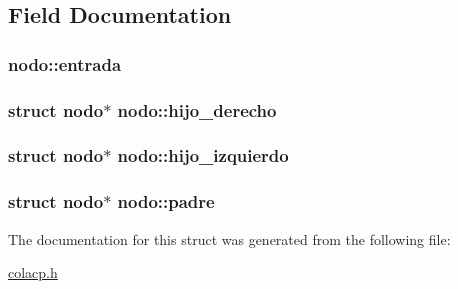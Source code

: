 \subsection{Field Documentation}
\hypertarget{structnodo_a6f1aad5bb142f067c93fe4b62ac8eb5b}{
\subsubsection[{entrada}]{ nodo\+::entrada}}\label{structnodo_a6f1aad5bb142f067c93fe4b62ac8eb5b}
\hypertarget{structnodo_af130c51b632b654403d8e49366918f9f}{
\subsubsection[{hijo\+\_\+derecho}]{\setlength{\rightskip}{0pt plus 5cm}struct {\bf nodo}$\ast$ nodo\+::hijo\+\_\+derecho}}\label{structnodo_af130c51b632b654403d8e49366918f9f}
\hypertarget{structnodo_afa64cf5f8a5d1df0ff495e7e915f0b67}{
\subsubsection[{hijo\+\_\+izquierdo}]{\setlength{\rightskip}{0pt plus 5cm}struct {\bf nodo}$\ast$ nodo\+::hijo\+\_\+izquierdo}}\label{structnodo_afa64cf5f8a5d1df0ff495e7e915f0b67}
\hypertarget{structnodo_ade731255c7e9f0a7f4515a4d45f9fd7b}{
\subsubsection[{padre}]{\setlength{\rightskip}{0pt plus 5cm}struct {\bf nodo}$\ast$ nodo\+::padre}}\label{structnodo_ade731255c7e9f0a7f4515a4d45f9fd7b}


The documentation for this struct was generated from the following file\+:\begin{DoxyCompactItemize}
\item 
\hyperlink{colacp_8h}{colacp.\+h}\end{DoxyCompactItemize}

